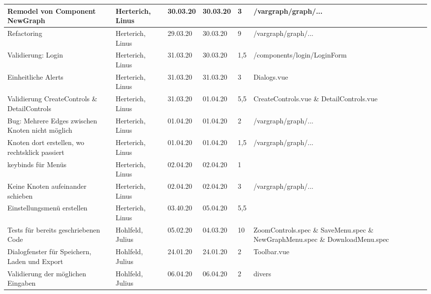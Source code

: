 \begin{itemize}
\begin{longtable}{|p{4cm}|p{2cm}|p{1.2cm}|p{1.2cm}|p{0.7cm}|p{3.8cm}|}
  Remodel von Component NewGraph                                        & Herterich, Linus      & 30.03.20 & 30.03.20 & 3     & /vargraph/graph/...                   \\ \hline
  Refactoring                                                           & Herterich, Linus      & 29.03.20 & 30.03.20 & 9     & /vargraph/graph/...                                 \\ \hline
  Validierung: Login                                                    & Herterich, Linus      & 31.03.20 & 30.03.20 & 1,5   & /components/login/LoginForm                                  \\ \hline
  Einheitliche Alerts                                                   & Herterich, Linus      & 31.03.20 & 31.03.20 & 3     & Dialogs.vue \\ \hline
  Validierung CreateControls \& DetailControls                          & Herterich, Linus      & 31.03.20 & 01.04.20 & 5,5   & CreateControls.vue \& DetailControls.vue               \\ \hline
  Bug: Mehrere Edges zwischen Knoten nicht möglich                      & Herterich, Linus      & 01.04.20 & 01.04.20 & 2     & /vargraph/graph/...                   \\ \hline
  Knoten dort erstellen, wo rechtsklick passiert                        & Herterich, Linus      & 01.04.20 & 01.04.20 & 1,5   & /vargraph/graph/...                               \\ \hline
  keybinds für Menüs                                                    & Herterich, Linus      & 02.04.20 & 02.04.20 & 1     &                                   \\ \hline
  Keine Knoten aufeinander schieben                                     & Herterich, Linus      & 02.04.20 & 02.04.20 & 3     & /vargraph/graph/...  \\ \hline
  Einstellungsmenü erstellen                                            & Herterich, Linus      & 03.40.20 & 05.04.20 & 5,5   &              \\ \hline
  Tests für bereits geschriebenen Code                                  & Hohlfeld, Julius      & 05.02.20 & 04.03.20 & 10    & ZoomControls.spec \& SaveMenu.spec \& NewGraphMenu.spec \& DownloadMenu.spec \\ \hline
  Dialogfenster für Speichern, Laden und Export                         & Hohlfeld, Julius      & 24.01.20 & 24.01.20 & 2     & Toolbar.vue \\ \hline
  Validierung der möglichen Eingaben                                    & Hohlfeld, Julius      & 06.04.20 & 06.04.20 & 2     & divers                             \\ \hline

\end{longtable}
\end{itemize}
